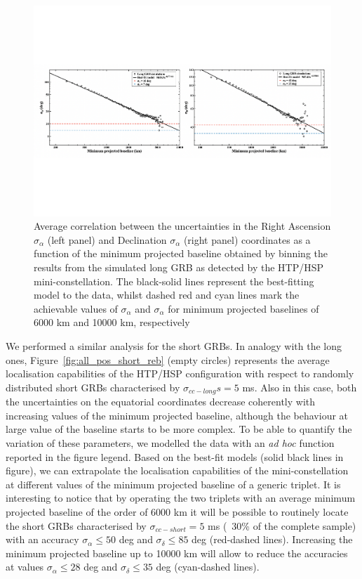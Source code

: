 \documentclass[]{spie}  %
\begin{document}
\begin{figure}[h!]
\centering
\includegraphics[scale=0.6,angle=0]{fig_all_pos_long_reb}
\vspace{-4cm}
\caption{Average correlation between the uncertainties in the Right Ascension $\sigma_\alpha$ (left panel) and Declination $\sigma_\alpha$ (right panel) coordinates as a function of the minimum projected baseline obtained by binning the results from the simulated long GRB as detected by the HTP/HSP mini-constellation. The black-solid lines represent the best-fitting model to the data, whilst dashed red and cyan lines mark the achievable values of $\sigma_\alpha$ and $\sigma_\alpha$ for minimum projected baselines of 6000 km and 10000 km, respectively} 
\label{fig:all_pos_long_reb}
\end{figure}

We performed a similar analysis for the short GRBs. In analogy with the long ones, Figure~\ref{fig:all_pos_short_reb} (empty circles) represents the average localisation capabilities of the HTP/HSP configuration with respect to randomly distributed short GRBs characterised by $\sigma_{cc-long}s = 5$ ms. Also in this case, both the uncertainties on the equatorial coordinates decrease coherently with increasing values of the minimum projected baseline, although the behaviour at large value of the baseline starts to be more complex. To be able to quantify the variation of these parameters, we modelled the data with an \emph{ad hoc} function reported in the figure legend. Based on the best-fit models (solid black lines in figure), we can extrapolate the localisation capabilities of the mini-constellation at different values of the minimum projected baseline of a generic triplet. It is interesting to notice that by operating the two triplets with an average minimum projected baseline of the order of 6000 km it will be possible to routinely locate the short GRBs characterised by $\sigma_{cc-short} = 5$ ms (~30\% of the complete sample) with an accuracy $\sigma_\alpha \leq 50$ deg and $\sigma_\delta \leq 85$ deg (red-dashed lines). Increasing the minimum projected baseline up to 10000 km will allow to reduce the accuracies at values $\sigma_\alpha \leq 28$ deg and $\sigma_\delta \leq 35$ deg (cyan-dashed lines).
\end{document}
